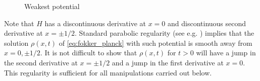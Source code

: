 \documentclass[12pt,reqno]{amsart}
\begin{document}
\begin{figure}%
\centering
{}
  \caption{Weakest potential}
  
\end{figure}
Note that $H$ has a discontinuous derivative at $x=0$ and discontinuous second derivative at $x = \pm 1/2.$
Standard parabolic regularity (see e.g. \cite{KrylSob}) implies that the solution $\rho(x,t)$ of \eqref{eq:fokker_planck} with such potential is smooth
away from $x=0,\pm 1/2.$ It is not difficult to show that $\rho(x,t)$ for $t >0$ will have a jump in the second derivative at $x =\pm 1/2$ and a jump in the first derivative
at $x=0.$ This regularity is sufficient for all manipulations carried out below.
\end{document}
